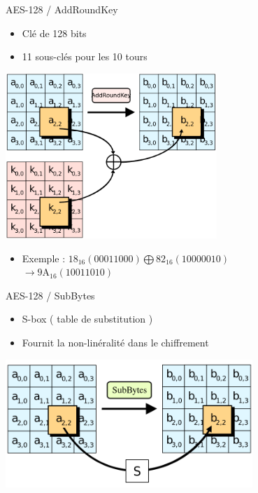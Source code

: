 \documentclass{beamer}
\begin{document}
\begin{frame}{AES-128 / AddRoundKey}
\begin{itemize}
    \item Clé de 128 bits
    \item 11 sous-clés pour les 10 tours
\end{itemize}
	\vspace{0.5 cm}
    \centering
    \includegraphics[width=0.6\textwidth]{images/AES-AddRoundKey.png}
\begin{itemize}
    \item Exemple : $ \text{1}8_{16} (00011000) \bigoplus 82_{16} (10000010) $\\
    $\longrightarrow 9\text{A}_{16} (10011010) $ \\ 
\end{itemize}
\end{frame}

\begin{frame}{AES-128 / SubBytes}
\begin{itemize}
    \item S-box ( table de substitution )
    \item Fournit la non-linéralité dans le chiffrement
\end{itemize}
    \vspace{0.5 cm}
    \centering
    \includegraphics[width=0.7\textwidth]{images/AES-SubBytes.png}
\end{frame}
\end{document}
